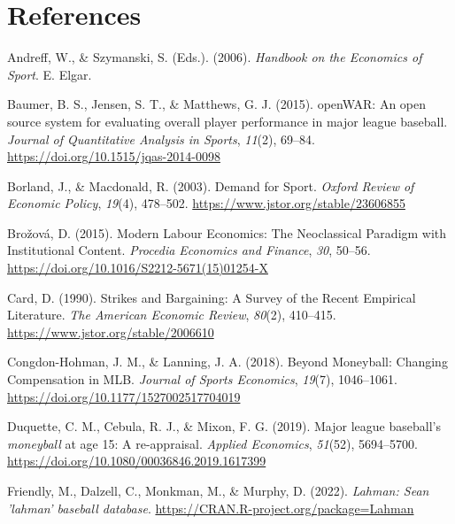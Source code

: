\documentclass[
  12pt,
  letterpaper,
  DIV=11,
  numbers=noendperiod]{scrartcl}
\newlength{\cslhangindent}
\newlength{\cslentryspacingunit} %
\newenvironment{CSLReferences}[2] %
 {%
  \setlength{\parindent}{0pt}
  \ifodd #1
  \let\oldpar\par
  \def\par{\hangindent=\cslhangindent\oldpar}
  \fi
  \setlength{\parskip}{#2\cslentryspacingunit}
 }%
 {}
\begin{document}
\hypertarget{references}{%
\section{References}\label{references}}

\hypertarget{refs}{}
\begin{CSLReferences}{1}{0}
\leavevmode{}%
Andreff, W., \& Szymanski, S. (Eds.). (2006). \emph{Handbook on the
{Economics} of {Sport}}. E. Elgar.

\leavevmode{}%
Baumer, B. S., Jensen, S. T., \& Matthews, G. J. (2015). {openWAR}: {An}
open source system for evaluating overall player performance in major
league baseball. \emph{Journal of Quantitative Analysis in Sports},
\emph{11}(2), 69--84. \url{https://doi.org/10.1515/jqas-2014-0098}

\leavevmode{}%
Borland, J., \& Macdonald, R. (2003). Demand for {Sport}. \emph{Oxford
Review of Economic Policy}, \emph{19}(4), 478--502.
\url{https://www.jstor.org/stable/23606855}

\leavevmode{}%
Brožová, D. (2015). Modern {Labour} {Economics}: {The} {Neoclassical}
{Paradigm} with {Institutional} {Content}. \emph{Procedia Economics and
Finance}, \emph{30}, 50--56.
\url{https://doi.org/10.1016/S2212-5671(15)01254-X}

\leavevmode{}%
Card, D. (1990). Strikes and {Bargaining}: {A} {Survey} of the {Recent}
{Empirical} {Literature}. \emph{The American Economic Review},
\emph{80}(2), 410--415. \url{https://www.jstor.org/stable/2006610}

\leavevmode{}%
Congdon-Hohman, J. M., \& Lanning, J. A. (2018). Beyond {Moneyball}:
{Changing} {Compensation} in {MLB}. \emph{Journal of Sports Economics},
\emph{19}(7), 1046--1061. \url{https://doi.org/10.1177/1527002517704019}

\leavevmode{}%
Duquette, C. M., Cebula, R. J., \& Mixon, F. G. (2019). Major league
baseball's \emph{moneyball} at age 15: A re-appraisal. \emph{Applied
Economics}, \emph{51}(52), 5694--5700.
\url{https://doi.org/10.1080/00036846.2019.1617399}

\leavevmode{}%
Friendly, M., Dalzell, C., Monkman, M., \& Murphy, D. (2022).
\emph{Lahman: Sean 'lahman' baseball database}.
\url{https://CRAN.R-project.org/package=Lahman}


\end{CSLReferences}
\end{document}
